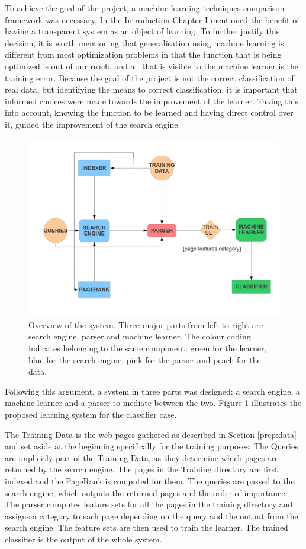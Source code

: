 \documentclass[12pt,notitlepage,twoside]{scrreprt}
\begin{document}
To achieve the goal of the project, a machine learning techniques comparison framework was
necessary. In the Introduction Chapter I mentioned the benefit of having a transparent
system as an object of learning. To further justify this decision, it is worth mentioning
that generalisation using machine learning is different from most optimization problems in
that the function that is being optimized is out of our reach, and all that is visible to
the machine learner is the training error. Because the goal of the project is not the
correct classification of real data, but identifying the means to correct classification,
it is important that informed choices were made towards the improvement of the learner.
Taking this into account, knowing the function to be learned and having direct control
over it, guided the improvement of the search engine. 
\begin{figure}[h!]
\centering
\includegraphics[width=\textwidth]{figs/overview.pdf}
\caption{Overview of the system. Three major parts from left to right are search engine,
parser and machine learner. The colour coding indicates belonging to the same component:
green for the learner, blue for the search engine, pink for the parser and peach for the
data.\label{overview}}
\end{figure}

Following this argument, a system in three parts was designed: a search engine, a machine
learner and a parser to mediate between the two.  Figure \ref{overview} illustrates the
proposed learning system for the classifier case.

The Training Data is the web pages gathered as described in Section \ref{prep:data} and
set aside at the beginning specifically for the training purposes. The Queries are
implicitly part of the Training Data, as they determine which pages are returned by the
search engine. The pages in the Training directory are first indexed and the PageRank is
computed for them. The queries are passed to the search engine, which outputs the returned
pages and the order of importance. The parser computes feature sets for all the pages in
the training directory and assigns a category to each page depending on the query and the
output from the search engine. The feature sets are then used to train the learner. The
trained classifier is the output of the whole system.
\end{document}
